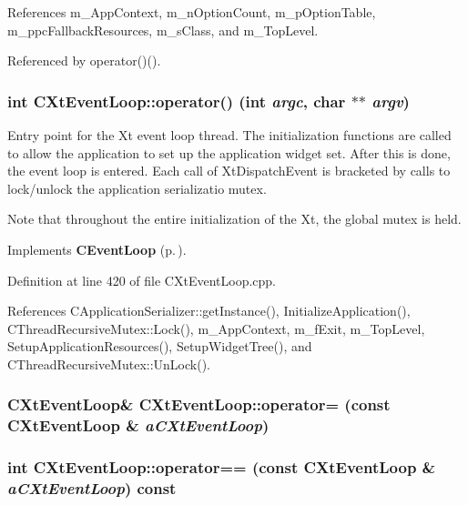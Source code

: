 References m\_\-App\-Context, m\_\-n\-Option\-Count, m\_\-p\-Option\-Table, m\_\-ppc\-Fallback\-Resources, m\_\-s\-Class, and m\_\-Top\-Level.

Referenced by operator()().
\subsubsection{\setlength{\rightskip}{0pt plus 5cm}int CXt\-Event\-Loop::operator() (int {\em argc}, char $\ast$$\ast$ {\em argv})\hspace{0.3cm}{\tt  [private, virtual]}}\label{classCXtEventLoop_c0}


Entry point for the Xt event loop thread. The initialization functions are called to allow the application to set up the application widget set. After this is done, the event loop is entered. Each call of Xt\-Dispatch\-Event is bracketed by calls to lock/unlock the application serializatio mutex.

Note that throughout the entire initialization of the Xt, the global mutex is held. 

Implements {\bf CEvent\-Loop} {\rm (p.\,\pageref{classCEventLoop_c0})}.

Definition at line 420 of file CXt\-Event\-Loop.cpp.

References CApplication\-Serializer::get\-Instance(), Initialize\-Application(), CThread\-Recursive\-Mutex::Lock(), m\_\-App\-Context, m\_\-f\-Exit, m\_\-Top\-Level, Setup\-Application\-Resources(), Setup\-Widget\-Tree(), and CThread\-Recursive\-Mutex::Un\-Lock().
\subsubsection{\setlength{\rightskip}{0pt plus 5cm}CXt\-Event\-Loop\& CXt\-Event\-Loop::operator= (const CXt\-Event\-Loop \& {\em a\-CXt\-Event\-Loop})\hspace{0.3cm}{\tt  [private]}}\label{classCXtEventLoop_c2}


\subsubsection{\setlength{\rightskip}{0pt plus 5cm}int CXt\-Event\-Loop::operator== (const CXt\-Event\-Loop \& {\em a\-CXt\-Event\-Loop}) const\hspace{0.3cm}{\tt  [private]}}\label{classCXtEventLoop_c3}


